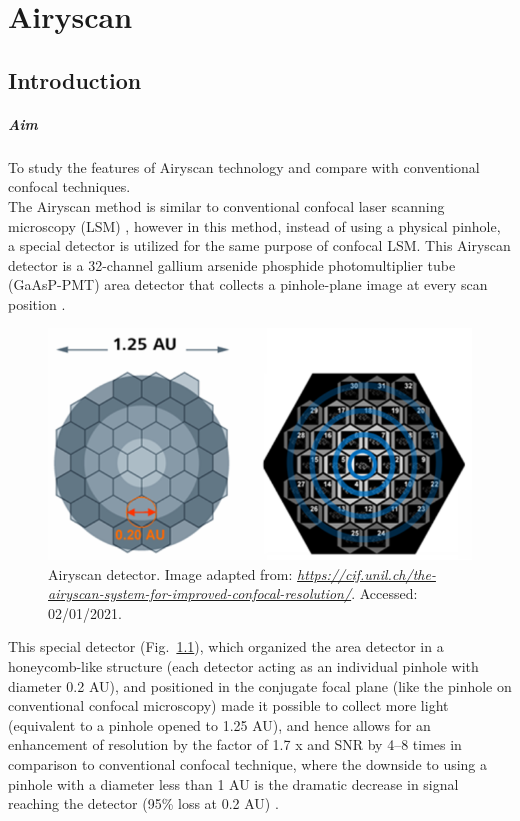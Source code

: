 
\chapter{Airyscan}
\label{chp:Airyscan}

\section{Introduction}

\paragraph{Aim}To study the features of Airyscan technology and compare with conventional confocal techniques.
\\

The Airyscan method is similar to conventional confocal laser scanning microscopy (LSM) , however in this method, instead of using a physical pinhole, a special detector is utilized for the same purpose of confocal LSM.  
This Airyscan detector is a 32-channel gallium arsenide phosphide photomultiplier tube (GaAsP-PMT) area detector that collects a pinhole-plane image at every scan position \cite{Huff2015}. 

\begin{figure}[h!]
\centering
\includegraphics[width=.5\columnwidth]{Exp_6_Airyscan/Figures/airyscan_ed}
\caption{Airyscan detector. Image adapted from: \href{https://cif.unil.ch/the-airyscan-system-for-improved-confocal-resolution/}{\textit{https://cif.unil.ch/the-airyscan-system-for-improved-confocal-resolution/}}. Accessed: 02/01/2021.} 
\label{fig:airydet}
\end{figure}

This special detector (Fig.~\ref{fig:airydet}), which organized the area detector in a honeycomb-like structure (each detector acting as an individual pinhole with diameter 0.2 AU), and positioned in the conjugate focal plane (like the pinhole on conventional confocal microscopy) made it possible to collect more light (equivalent to a pinhole opened to 1.25 AU), and hence allows for an enhancement of resolution by the factor of 1.7 x and SNR by 4–8 times \cite{Bergter2016} in comparison to conventional confocal technique, where the downside to using a pinhole with a diameter less than 1 AU is the dramatic decrease in signal reaching the detector (95\% loss at 0.2 AU) \cite{Huff2015}.

